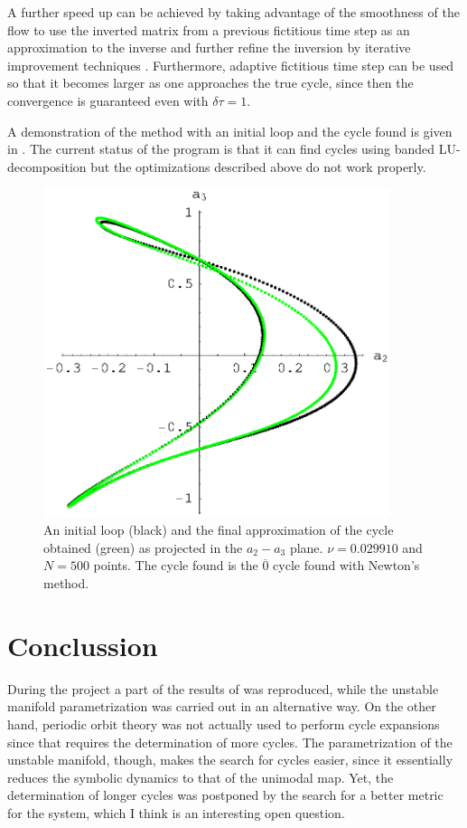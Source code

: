\documentclass[pre,preprint,groupedaddress,showpacs,showkeys]{revtex4}
\begin{document}
    A further speed up can be achieved by taking advantage of the smoothness of the flow to use
    the inverted matrix from a previous fictitious time step as an approximation to the inverse
    and further refine the inversion by iterative improvement techniques \cite{Press:96}. Furthermore,
    adaptive fictitious time step can be used so that it becomes larger as one approaches the true
    cycle, since then the convergence is guaranteed even with $\delta \tau=1$.

    A demonstration of the method with an initial loop and the cycle found is given in .
    The current status of the program is that it can find cycles using banded LU-decomposition but
    the optimizations described above do not work properly.

  \begin{figure}[h!]
      \includegraphics[width=4in]{figs/loop.eps}
      \caption{ An initial loop (black) and the final approximation of the cycle obtained (green) as projected in
      the $a_2 - a_3$ plane. $\nu=0.029910$ and $N=500$ points. The cycle found is the $\overline{0}$ cycle found
      with Newton's method.}
  \label{fig:loop}
  \end{figure}


\section{Conclussion}

 During the project a part of the results of \cite{Christiansen:97}
 was reproduced, while the unstable manifold parametrization was
 carried out in an alternative way. On the other hand, periodic orbit
 theory was not actually used to perform cycle expansions since that
 requires the determination of more cycles. The parametrization of the
 unstable manifold, though, makes the search for cycles easier, since
 it essentially reduces the symbolic dynamics to that of the unimodal map.
 Yet, the determination of longer cycles was postponed by the search for a better metric for the
 system, which I think is an interesting open question.
\end{document}

